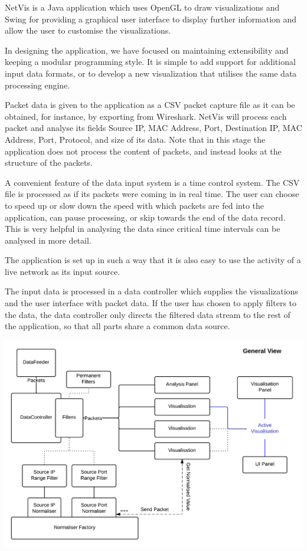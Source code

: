 NetVis is a Java application which uses OpenGL to draw visualizations and Swing for providing a graphical user interface to display further information and allow the user to customise the visualizations.

In designing the application, we have focused on maintaining extensibility and keeping a modular programming style. It is simple to add support for additional input data formats, or to develop a new visualization that utilises the same data processing engine.

Packet data is given to the application as a CSV packet capture file as it can be obtained, for instance, by exporting from Wireshark. NetVis will process each packet and analyse its fields Source IP, MAC Address, Port, Destination IP, MAC Address, Port, Protocol, and size of its data. Note that in this stage the application does not process the content of packets, and instead looks at the structure of the packets.

A convenient feature of the data input system is a time control system. The CSV file is processed as if its packets were coming in in real time. The user can choose to speed up or slow down the speed with which packets are fed into the application, can pause processing, or skip towards the end of the data record. This is very helpful in analysing the data since critical time intervals can be analysed in more detail.

The application is set up in such a way that it is also easy to use the activity of a live network as its input source.

The input data is processed in a data controller which supplies the visualizations and the user interface with packet data. If the user has chosen to apply filters to the data, the data controller only directs the filtered data stream to the rest of the application, so that all parts share a common data source.

\includegraphics[width=\linewidth]{materials/architecture.jpg}

